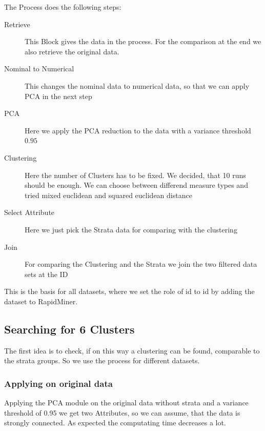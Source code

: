 The Process does the following steps:
\begin{description}
	\item[Retrieve] This Block gives the data in the process. For the comparison at the end we also retrieve the original data.
	\item[Nominal to Numerical] This changes the nominal data to numerical data, so that we can apply PCA in the next step
	\item[PCA] Here we apply the PCA reduction to the data with a variance threshold $0.95$
	\item[Clustering] Here the number of Clusters has to be fixed. We decided, that 10 runs should be enough. We can choose between differend measure types and tried mixed euclidean and squared euclidean distance
	\item[Select Attribute] Here we just pick the Strata data for comparing with the clustering
	\item[Join] For comparing the Clustering and the Strata we join the two filtered data sets at the ID
\end{description}

This is the basis for all datasets, where we set the role of id to id by adding the dataset to RapidMiner.

\subsection{Searching for 6 Clusters}

The first idea is to check, if on this way a clustering can be found, comparable to the strata groups. So we use the process for different datasets.

\subsubsection{Applying on original data}
Applying the PCA module on the original data without strata and a variance
threshold of 0.95 we get two Attributes, so we can assume, that the data is strongly connected. As expected the computating time decreases a lot. 

